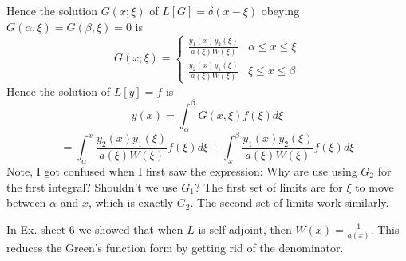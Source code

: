Hence the solution $G(x;\xi)$ of $L[G]=\delta(x-\xi)$ obeying
$G(\alpha,\xi)= G(\beta,\xi)=0$ is 
\[G(x;\xi)=
  \begin{cases}
    \frac{y_1(x)y_2(\xi)}{a(\xi)W(\xi)} & \alpha\le x \le \xi \\ 
    \frac{y_2(x)y_1(\xi)}{a(\xi)W(\xi)} & \xi\le x \le \beta
  \end{cases}
\]
Hence the solution of $L[y]=f$ is
\[y(x)=\int_{\alpha}^{\beta} G(x,\xi)f(\xi)d\xi \]
\[= \int_{\alpha}^{x} \frac{y_2(x) y_1(\xi)}{a(\xi) W(\xi)} f(\xi)d\xi + \int_{x}^{\beta}
\frac{y_1(x) y_2(\xi)}{a(\xi) W(\xi)} f(\xi)d\xi\]
Note, I got confused when I first saw the expression: Why are use using $G_2$ for the
first integral? Shouldn't we use $G_1$? The first set of limits are for $\xi$ to move
between $\alpha$ and $x$, which is exactly $G_2$. The second set of limits work similarly.
\begin{remark}
  In Ex. sheet 6 we showed that when $L$ is self adjoint, then $W(x)=\frac{1}{a(x)}$. This
  reduces the Green's function form by getting rid of the denominator.
\end{remark}

